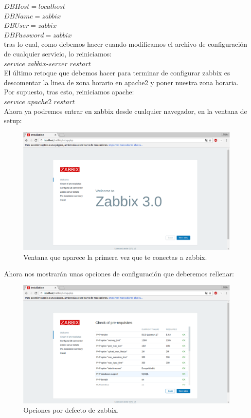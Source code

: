 \begin{itemize}
	$DBHost=localhost$\\
	$DBName=zabbix$\\
	$DBUser=zabbix$\\
	$DBPassword=zabbix$\\
	
	tras lo cual, como debemos hacer cuando modificamos el archivo de configuración de cualquier servicio, lo reiniciamos:\\
	
	$service$ $zabbix$-$server$ $restart$\\
	
	El último retoque que debemos hacer para terminar de configurar zabbix es descomentar la linea de zona horario en apache2 y poner nuestra zona horaria. Por supuesto, tras esto, reiniciamos apache:\\
	
	$service$ $apache2$ $restart$\\
	
	Ahora ya podremos entrar en zabbix desde cualquier navegador, en la ventana de setup:\\
	
	\begin{figure}[H]
	\centering
	\includegraphics[width=0.7\linewidth]{zabbix1}
	\caption[Inicio de zabbix]{Ventana que aparece la primera vez que te conectas a zabbix.}
	\label{fig:zabbix1}
	\end{figure}
	
	Ahora nos mostrarán unas opciones de configuración que deberemos rellenar:\\
	
	\begin{figure}[H]
	\centering
	\includegraphics[width=0.7\linewidth]{zabbix2}
	\caption[zabbix2]{Opciones por defecto de zabbix.}
	\label{fig:zabbix2}
	\end{figure}
	

\end{itemize}
